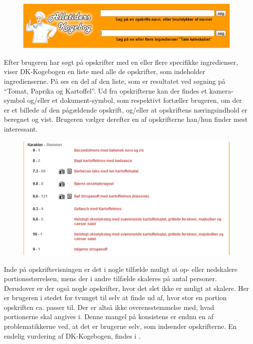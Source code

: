 \begin{figure}[H]
\centering
\includegraphics[scale=0.7]{billeder/forbilleder/dk-kogebogen.png}
\label{fig:dk-kogebogen1}
\end{figure}

Efter brugeren har søgt på opskrifter med en eller flere specifikke ingredienser, viser DK-Kogebogen en liste med alle de opskrifter, som indeholder ingredienserne. På  ses en del af den liste, som er resultatet ved søgning på ``Tomat, Paprika og Kartoffel''. Ud fra opskrifterne kan der findes et kamera-symbol og/eller et dokument-symbol, som respektivt fortæller brugeren, om der er et billede af den pågældende opskrift, og/eller at opskriftens næringsindhold er beregnet og vist. Brugeren vælger derefter en af opskrifterne han/hun finder mest interessant. 

\begin{figure}[H]
\centering
\includegraphics[scale=0.7]{billeder/forbilleder/dk-kogebogen2.png}
\label{fig:dk-kogebogen2}
\end{figure}

Inde på opskriftsvisningen er det i nogle tilfælde muligt at op- eller nedskalere portionsstørrelsen, mens der i andre tilfælde skaleres på antal personer. Derudover er der også nogle opskrifter, hvor det slet ikke er muligt at skalere. Her er brugeren i stedet for tvunget til selv at finde ud af, hvor stor en portion opskriften ca. passer til. Der er altså ikke overensstemmelse med, hvad portionerne skal angives i. Denne mangel på konsistens er endnu en af problematikkerne ved, at det er brugerne selv, som indsender opskrifterne. En endelig vurdering af DK-Kogebogen, findes i .
